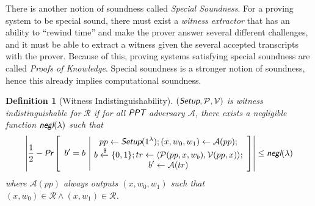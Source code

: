\documentclass{article}
\theoremstyle{plain}
\newtheorem{definition}{Definition}[section]
\theoremstyle{remark}
\begin{document}
There is another notion of soundness called \textit{Special Soundness}. For a proving system to be special sound, there must exist a \textit{witness extractor} that has an ability to ``rewind time'' and make the prover answer several different challenges, and it must be able to extract a witness given the several accepted transcripts with the prover. Because of this, proving systems satisfying special soundness are called \textit{Proofs of Knowledge}. Special soundness is a stronger notion of soundness, hence this already implies computational soundness.

\begin{definition}[Witness Indistinguishability]
	$(\emph{\textsf{Setup}}, \mathcal{P}, \mathcal{V})$ is witness indistinguishable for $\mathcal{R}$ if for all $\emph{\textsf{PPT}}$ adversary $\mathcal{A}$, there exists a negligible function $\emph{\textsf{negl}}(\lambda)$ such that
	\begin{align*}
		\left| \frac{1}{2} - \emph{\textsf{Pr}}\left[
		\begin{array}{c|c}
			\begin{gathered}
				b' = b
			\end{gathered}
			&
			\begin{gathered}
				pp\leftarrow\emph{\textsf{Setup}}(1^{\lambda}); (x, w_0, w_1)\leftarrow\mathcal{A}(pp); \\
				b\xleftarrow{\$}\{0,1\}; tr\leftarrow\langle\mathcal{P}(pp,x,w_b), \mathcal{V}(pp,x)\rangle; \\
				b'\leftarrow\mathcal{A}(tr)
			\end{gathered}
		\end{array}
		\right]\right|
		\le\emph{\textsf{negl}}(\lambda)
	\end{align*}
	where $\mathcal{A}(pp)$ always outputs $(x,w_0,w_1)$ such that $(x,w_0)\in\mathcal{R}\wedge(x,w_1)\in\mathcal{R}$.
\end{definition}
\end{document}
